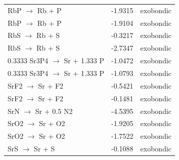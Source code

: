 \begin{longtable}{@{}lrl@{}}
RbP $\rightarrow$ Rb + P & -1.9315 & exobondic \\
RbP $\rightarrow$ Rb + P & -1.9104 & exobondic \\
RbS $\rightarrow$ Rb + S & -0.3217 & exobondic \\
RbS $\rightarrow$ Rb + S & -2.7347 & exobondic \\
0.3333 Sr3P4 $\rightarrow$ Sr + 1.333 P & -1.0472 & exobondic \\
0.3333 Sr3P4 $\rightarrow$ Sr + 1.333 P & -1.0793 & exobondic \\
SrF2 $\rightarrow$ Sr + F2 & -0.5421 & exobondic \\
SrF2 $\rightarrow$ Sr + F2 & -0.1481 & exobondic \\
SrN $\rightarrow$ Sr + 0.5 N2 & -4.5395 & exobondic \\
SrO2 $\rightarrow$ Sr + O2 & -1.9205 & exobondic \\
SrO2 $\rightarrow$ Sr + O2 & -1.7522 & exobondic \\
SrS $\rightarrow$ Sr + S & -0.1088 & exobondic \\
\end{longtable}
